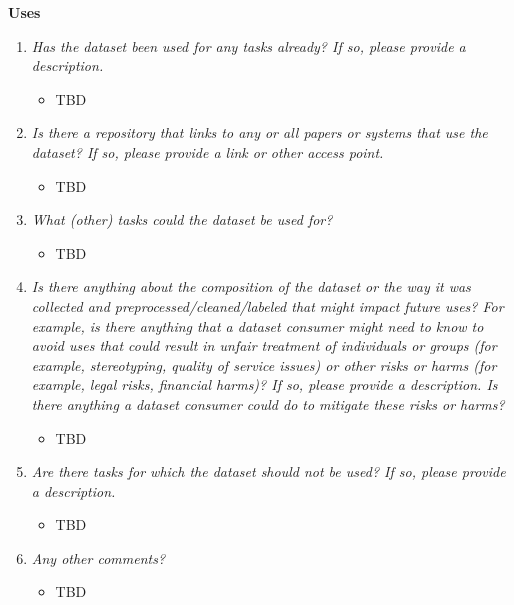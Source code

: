 \documentclass[
  letterpaper,
  DIV=11,
  numbers=noendperiod]{scrartcl}
\providecommand{\tightlist}{%
  \setlength{\itemsep}{0pt}\setlength{\parskip}{0pt}}\usepackage{longtable,booktabs,array}
\begin{document}
\textbf{Uses}

\begin{enumerate}
\def\labelenumi{\arabic{enumi}.}
\tightlist
\item
  \emph{Has the dataset been used for any tasks already? If so, please
  provide a description.}

  \begin{itemize}
  \tightlist
  \item
    TBD
  \end{itemize}
\item
  \emph{Is there a repository that links to any or all papers or systems
  that use the dataset? If so, please provide a link or other access
  point.}

  \begin{itemize}
  \tightlist
  \item
    TBD
  \end{itemize}
\item
  \emph{What (other) tasks could the dataset be used for?}

  \begin{itemize}
  \tightlist
  \item
    TBD
  \end{itemize}
\item
  \emph{Is there anything about the composition of the dataset or the
  way it was collected and preprocessed/cleaned/labeled that might
  impact future uses? For example, is there anything that a dataset
  consumer might need to know to avoid uses that could result in unfair
  treatment of individuals or groups (for example, stereotyping, quality
  of service issues) or other risks or harms (for example, legal risks,
  financial harms)? If so, please provide a description. Is there
  anything a dataset consumer could do to mitigate these risks or
  harms?}

  \begin{itemize}
  \tightlist
  \item
    TBD
  \end{itemize}
\item
  \emph{Are there tasks for which the dataset should not be used? If so,
  please provide a description.}

  \begin{itemize}
  \tightlist
  \item
    TBD
  \end{itemize}
\item
  \emph{Any other comments?}

  \begin{itemize}
  \tightlist
  \item
    TBD
  \end{itemize}
\end{enumerate}
\end{document}
